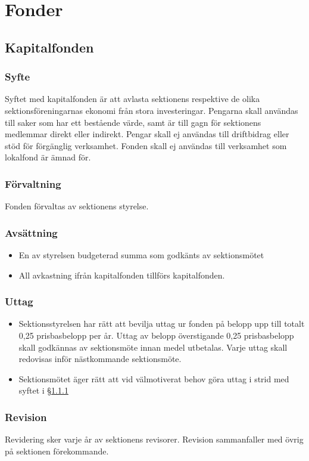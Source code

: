 \documentclass{dtek}
\begin{document}
\section{Fonder}
\subsection{Kapitalfonden}
\subsubsection{Syfte}
\label{sec:kapitalfond_syfte}
Syftet med kapitalfonden är att avlasta sektionens respektive de olika sektionsföreningarnas ekonomi från stora investeringar. Pengarna skall användas till saker som har ett bestående värde, samt är till gagn för sektionens medlemmar direkt eller indirekt. Pengar skall ej användas till driftbidrag eller stöd för förgänglig verksamhet. Fonden skall ej användas till verksamhet som lokalfond är ämnad för.
\subsubsection{Förvaltning}
Fonden förvaltas av sektionens styrelse.
\subsubsection{Avsättning}
\begin{itemize}
\item En av styrelsen budgeterad summa som godkänts av sektionsmötet
\item All avkastning ifrån kapitalfonden tillförs kapitalfonden.
\end{itemize}
\subsubsection{Uttag}
\begin{itemize}
\item Sektionsstyrelsen har rätt att bevilja uttag ur fonden på belopp upp till totalt 0,25 prisbasbelopp per år. Uttag av belopp överstigande 0,25 prisbasbelopp skall godkännas av sektionsmöte innan medel utbetalas. Varje uttag skall redovisas inför nästkommande sektionsmöte.
\item Sektionsmötet äger rätt att vid välmotiverat behov göra uttag i strid med syftet i §\ref{sec:kapitalfond_syfte}
\end{itemize}
\subsubsection{Revision}
Revidering sker varje år av sektionens revisorer. Revision sammanfaller med övrig på sektionen förekommande.
\end{document}
